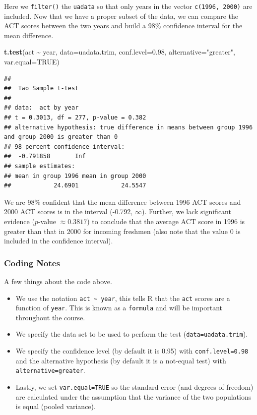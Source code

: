 \documentclass[
]{book}
\newenvironment{Shaded}{\begin{snugshade}}{\end{snugshade}}
\newcommand{\AttributeTok}[1]{\textcolor[rgb]{0.13,0.29,0.53}{#1}}
\newcommand{\ConstantTok}[1]{\textcolor[rgb]{0.56,0.35,0.01}{#1}}
\newcommand{\FloatTok}[1]{\textcolor[rgb]{0.00,0.00,0.81}{#1}}
\newcommand{\FunctionTok}[1]{\textcolor[rgb]{0.13,0.29,0.53}{\textbf{#1}}}
\newcommand{\NormalTok}[1]{#1}
\newcommand{\SpecialCharTok}[1]{\textcolor[rgb]{0.81,0.36,0.00}{\textbf{#1}}}
\newcommand{\StringTok}[1]{\textcolor[rgb]{0.31,0.60,0.02}{#1}}
\providecommand{\tightlist}{%
  \setlength{\itemsep}{0pt}\setlength{\parskip}{0pt}}
\begin{document}
Here we \texttt{filter()} the \texttt{uadata} so that only years in the vector \texttt{c(1996,\ 2000)} are included. Now that we have a proper subset of the data, we can compare the ACT scores between the two years and build a 98\% confidence interval for the mean difference.

\begin{Shaded}
\begin{Highlighting}[]
\FunctionTok{t.test}\NormalTok{(act }\SpecialCharTok{\textasciitilde{}}\NormalTok{ year, }\AttributeTok{data=}\NormalTok{uadata.trim, }\AttributeTok{conf.level=}\FloatTok{0.98}\NormalTok{, }
       \AttributeTok{alternative=}\StringTok{"greater"}\NormalTok{, }\AttributeTok{var.equal=}\ConstantTok{TRUE}\NormalTok{)}
\end{Highlighting}
\end{Shaded}

\begin{verbatim}
## 
##  Two Sample t-test
## 
## data:  act by year
## t = 0.3013, df = 277, p-value = 0.382
## alternative hypothesis: true difference in means between group 1996 and group 2000 is greater than 0
## 98 percent confidence interval:
##  -0.791858       Inf
## sample estimates:
## mean in group 1996 mean in group 2000 
##            24.6901            24.5547
\end{verbatim}

We are 98\% confident that the mean difference between 1996 ACT scores and 2000 ACT scores is in the interval (-0.792, \(\infty\)).
Further, we lack significant evidence (\(p\)-value \(\approx 0.3817\)) to conclude that the average ACT score in 1996 is greater than that in 2000 for incoming freshmen (also note that the value 0 is included in the confidence interval).

\hypertarget{coding-notes-3}{%
\subsubsection{Coding Notes}\label{coding-notes-3}}

A few things about the code above.

\begin{itemize}
\tightlist
\item
  We use the notation \texttt{act\ \textasciitilde{}\ year}, this tells R that the \texttt{act} scores are a function of \texttt{year}. This is known as a \texttt{formula} and will be important throughout the course.
\item
  We specify the data set to be used to perform the test (\texttt{data=uadata.trim}).
\item
  We specify the confidence level (by default it is 0.95) with \texttt{conf.level=0.98} and the alternative hypothesis (by default it is a not-equal test) with \texttt{alternative=greater}.
\item
  Lastly, we set \texttt{var.equal=TRUE} so the standard error (and degrees of freedom) are calculated under the assumption that the variance of the two populations is equal (pooled variance).
\end{itemize}
\end{document}
